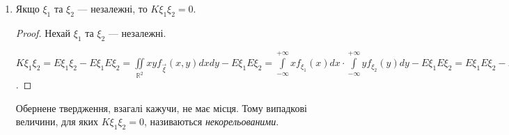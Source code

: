 \begin{enumerate}
\begin{proof}
\begin{enumerate}[label=\Roman*.]
            $\left|K\xi_1\xi_2\right| \leq \sigma_{\xi_1} \sigma_{\xi_2}$.

            \item Введемо центровані нормовані випадкові величини $\xi_H = \frac{\xi - E\xi}
            {\sigma_\xi}$, $E\xi_H =0$, $D\xi_H = 1$.

            $E(\xi_{1H} \pm \xi_{2H})^2 \geq 0 \Leftrightarrow 
            E(\xi^2_{1H}\pm2\xi_{1H}\xi_{2H}+\xi^2_{2H}) \geq 0 
            \Leftrightarrow 2 \pm 
            2\frac{K\xi_1\xi_2}{\sigma_{\xi_1}\sigma_{\xi_2}} \geq 0 
            \Leftrightarrow $

            $\left|K\xi_1\xi_2\right| \leq \sigma_{\xi_1} \sigma_{\xi_2}$.
        \end{enumerate}
    \end{proof}
    \item Якщо $\xi_1$ та $\xi_2$ --- незалежні, то $K\xi_1\xi_2 = 0$.
    \begin{proof}
        Нехай $\xi_1$ та $\xi_2$ --- незалежні.

        $K\xi_1\xi_2 = E\xi_1\xi_2 - E\xi_1E\xi_2 = 
        \iint\limits_{\mathbb{R}^2} xy f_{\vec{\xi}}(x,y)dx dy 
        - E\xi_1E\xi_2
        = \int\limits_{-\infty}^{+\infty}xf_{\xi_1}(x)dx \cdot
        \int\limits_{-\infty}^{+\infty}yf_{\xi_2}(y)dy
        - E\xi_1E\xi_2 = 
        E\xi_1E\xi_2 - E\xi_1E\xi_2 = 0$.
    \end{proof}

    Обернене твердження, взагалі кажучи, не має місця. Тому випадкові 
    величини, для яких $K\xi_1\xi_2 = 0$, називаються 
    \emph{некорельованими}.
\end{enumerate}

